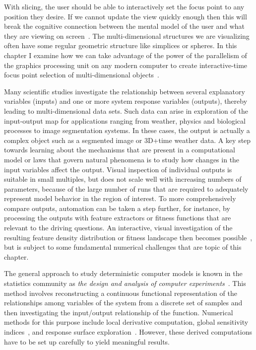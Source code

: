 

With slicing, the user should be able to interactively set the focus point to
any position they desire. If we cannot update the view quickly enough then this
will break the cognitive connection between the mental model of the user and
what they are viewing on screen~\cite{Shneiderman:1987}. The multi-dimensional
structures we are visualizing often have some regular geometric structure like
simplices or spheres.  In this chapter I examine how we can take advantage of
the power of the parallelism of the graphics processing unit on any modern
computer to create interactive-time focus point selection of multi-dimensional
objects~\cite{Torsney-Weir:2017}.



Many scientific studies investigate the relationship between
several explanatory variables (inputs) and one or more system response
variables (outputs), thereby leading to multi-dimensional data sets.  Such data
can arise in exploration of the input-output map for applications ranging from
weather, physics and biological processes to image segmentation systems.  
In these cases, the output
is actually a complex object such as a segmented image or 3D+time weather data.
A key step towards learning about the mechanisms that are present in a
computational model or laws that govern natural phenomena is to study how
changes in the input variables affect the output.  Visual inspection of
individual outputs is suitable in small multiples, but does not scale well with
increasing numbers of parameters, because of the large number of runs that are
required to adequately represent model behavior in the region of interest.  To
more comprehensively compare outputs, automation can be taken a step further,
for instance, by processing the outputs with feature extractors or fitness
functions that are relevant to the driving questions.  An interactive, visual
investigation of the resulting feature density distribution or fitness
landscape then becomes
possible~\cite{Feiner:1990,Muhlbacher:2013,Piringer:2010}, but is subject to 
some fundamental numerical
challenges that are topic of this chapter.

The general approach to
study deterministic computer models is known in the statistics community as
\emph{the design and analysis of computer experiments}~\cite{Santner:2003}.
This method involves reconstructing a continuous functional representation of
the relationships among variables of the system from a discrete set of 
samples and then investigating the
input/output relationship of the function.  Numerical methods for
this purpose include local derivative computation, global sensitivity
indices~\cite{Saltelli:2008}, and response surface
exploration~\cite{Box:2007}.  However, these derived computations have to be
set up carefully to yield meaningful results. 

